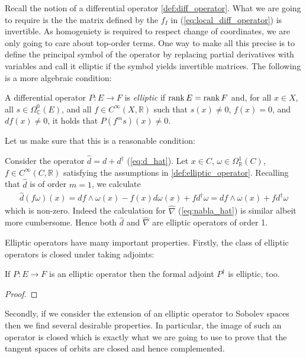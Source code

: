 \documentclass[12pt]{ociamthesis}  %
\begin{document}
Recall the notion of a differential operator \ref{def:diff_operator}.
What we are going to require is the the matrix defined by the
$f_I$ in (\ref{eq:local_diff_operator}) is invertible.
As homogeniety is required to respect change of coordinates,
we are only going to care about top-order terms. One way to make all
this precise is to define the principal symbol of the operator by
replacing partial derivatives with variables and
call it elliptic if the symbol yields invertible matrices.
The following is a more algebraic condition:

\begin{definition}\label{def:elliptic_operator}
  A differential operator $P:E\to F$ is \emph{elliptic} if
  $\operatorname{rank} E = \operatorname{rank} F$ and, for all $x\in X$, all $s\in\Omega^0_{\mathbb C}(E)$,
  and all $f\in C^\infty(X,\mathbb R)$ such that $s(x) \neq 0$,
  $f(x) = 0$, and $df(x) \neq 0$, it holds that $P(f^m s)(x) \neq 0$.
\end{definition}

Let us make sure that this is a reasonable condition:

\begin{example}
  Consider the operator $\hat d = d + d^\dagger$ (\ref{eq:d_hat}). Let
  $x\in C$, $\omega\in\Omega^1_{\mathbb R}(C)$,
  $f\in C^\infty(C,\mathbb R)$
  satisfying the assumptions in \ref{def:elliptic_operator}.
  Recalling that $\hat d$ is of order $m=1$, we calculate
  \begin{align*}
    \hat d(f\omega)(x)= df\wedge \omega(x) - f(x)d\omega(x) + fd^\dagger\omega= df\wedge\omega(x) + fd^\dagger\omega
  \end{align*}
  which is non-zero.  Indeed the calculation for
  $\hat\nabla$ (\ref{eq:nabla_hat}) is similar albeit more cumbersome.
  Hence both $\hat d$ and $\hat\nabla$ are elliptic operators of order 1.
\end{example}

Elliptic operators have many important properties. Firstly, the class
of elliptic operators is closed under taking adjoints:

\begin{lemma}\label{lem:elliptic_adjoints}
  If $P : E \to F$ is an elliptic operator then the formal adjoint
  $P^\dagger$ is elliptic, too.
  \begin{proof}
    \missingproof
  \end{proof}
\end{lemma}

Secondly, if we consider the extension of an elliptic operator
to Sobolev spaces then we find several desirable properties.
In particular, the image of such an operator is closed which is
exactly what we are going to use to prove that the tangent spaces
of orbits are closed and hence complemented.
\end{document}
